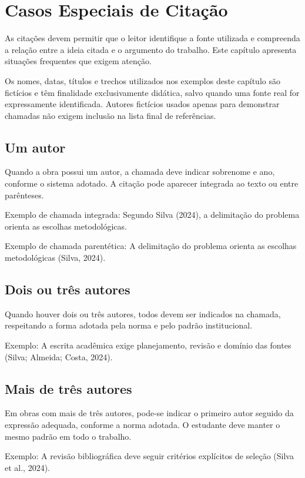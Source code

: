 \chapter{Casos Especiais de Citação}
\label{chap:casos-citacao}

As citações devem permitir que o leitor identifique a fonte utilizada e compreenda a relação entre a ideia citada e o argumento do trabalho. Este capítulo apresenta situações frequentes que exigem atenção.

Os nomes, datas, títulos e trechos utilizados nos exemplos deste capítulo são fictícios e têm finalidade exclusivamente didática, salvo quando uma fonte real for expressamente identificada. Autores fictícios usados apenas para demonstrar chamadas não exigem inclusão na lista final de referências.

\section{Um autor}

Quando a obra possui um autor, a chamada deve indicar sobrenome e ano, conforme o sistema adotado. A citação pode aparecer integrada ao texto ou entre parênteses.

Exemplo de chamada integrada: Segundo Silva (2024), a delimitação do problema orienta as escolhas metodológicas.

Exemplo de chamada parentética: A delimitação do problema orienta as escolhas metodológicas (Silva, 2024).

\section{Dois ou três autores}

Quando houver dois ou três autores, todos devem ser indicados na chamada, respeitando a forma adotada pela norma e pelo padrão institucional.

Exemplo: A escrita acadêmica exige planejamento, revisão e domínio das fontes (Silva; Almeida; Costa, 2024).

\section{Mais de três autores}

Em obras com mais de três autores, pode-se indicar o primeiro autor seguido da expressão adequada, conforme a norma adotada. O estudante deve manter o mesmo padrão em todo o trabalho.

Exemplo: A revisão bibliográfica deve seguir critérios explícitos de seleção (Silva et al., 2024).

